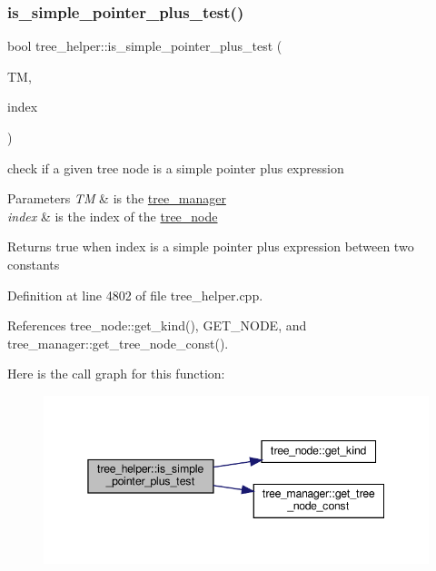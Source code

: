 \subsubsection{\texorpdfstring{is\+\_\+simple\+\_\+pointer\+\_\+plus\+\_\+test()}{is\_simple\_pointer\_plus\_test()}}
{\footnotesize\ttfamily bool tree\+\_\+helper\+::is\+\_\+simple\+\_\+pointer\+\_\+plus\+\_\+test (\begin{DoxyParamCaption}\item[{const \hyperlink{tree__manager_8hpp_a792e3f1f892d7d997a8d8a4a12e39346}{tree\+\_\+manager\+Const\+Ref} \&}]{TM,  }\item[{const unsigned int}]{index }\end{DoxyParamCaption})\hspace{0.3cm}{\ttfamily [static]}}



check if a given tree node is a simple pointer plus expression 


\begin{DoxyParams}{Parameters}
{\em TM} & is the \hyperlink{classtree__manager}{tree\+\_\+manager} \\
\hline
{\em index} & is the index of the \hyperlink{classtree__node}{tree\+\_\+node} \\
\hline
\end{DoxyParams}
\begin{DoxyReturn}{Returns}
true when index is a simple pointer plus expression between two constants 
\end{DoxyReturn}


Definition at line 4802 of file tree\+\_\+helper.\+cpp.



References tree\+\_\+node\+::get\+\_\+kind(), G\+E\+T\+\_\+\+N\+O\+DE, and tree\+\_\+manager\+::get\+\_\+tree\+\_\+node\+\_\+const().

Here is the call graph for this function\+:
\nopagebreak
\begin{figure}[H]
\begin{center}
\leavevmode
\includegraphics[width=345pt]{d7/d99/classtree__helper_a82b336f89ab98b3512e1cc607aef4825_cgraph}
\end{center}
\end{figure}
\mbox{\label{classtree__helper_ad4b926e495f820818638a879ba292f4b}} 

